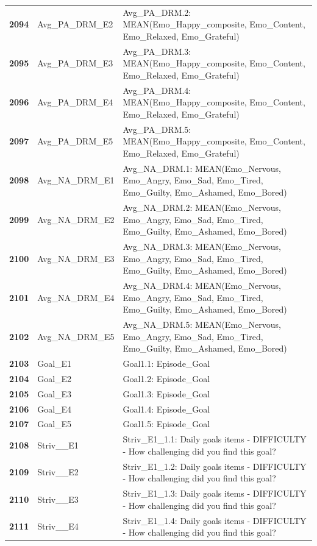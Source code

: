 \documentclass[
  letterpaper,
  DIV=11,
  numbers=noendperiod]{scrartcl}
\begin{document}
\begin{longtable}[t]{>{}cll}
\textbf{2094} & Avg\_PA\_DRM\_E2 & Avg\_PA\_DRM.2: MEAN(Emo\_Happy\_composite, Emo\_Content, Emo\_Relaxed, Emo\_Grateful)\\
\textbf{2095} & Avg\_PA\_DRM\_E3 & Avg\_PA\_DRM.3: MEAN(Emo\_Happy\_composite, Emo\_Content, Emo\_Relaxed, Emo\_Grateful)\\
\addlinespace
\textbf{2096} & Avg\_PA\_DRM\_E4 & Avg\_PA\_DRM.4: MEAN(Emo\_Happy\_composite, Emo\_Content, Emo\_Relaxed, Emo\_Grateful)\\
\textbf{2097} & Avg\_PA\_DRM\_E5 & Avg\_PA\_DRM.5: MEAN(Emo\_Happy\_composite, Emo\_Content, Emo\_Relaxed, Emo\_Grateful)\\
\textbf{2098} & Avg\_NA\_DRM\_E1 & Avg\_NA\_DRM.1: MEAN(Emo\_Nervous, Emo\_Angry, Emo\_Sad, Emo\_Tired, Emo\_Guilty, Emo\_Ashamed, Emo\_Bored)\\
\textbf{2099} & Avg\_NA\_DRM\_E2 & Avg\_NA\_DRM.2: MEAN(Emo\_Nervous, Emo\_Angry, Emo\_Sad, Emo\_Tired, Emo\_Guilty, Emo\_Ashamed, Emo\_Bored)\\
\textbf{2100} & Avg\_NA\_DRM\_E3 & Avg\_NA\_DRM.3: MEAN(Emo\_Nervous, Emo\_Angry, Emo\_Sad, Emo\_Tired, Emo\_Guilty, Emo\_Ashamed, Emo\_Bored)\\
\addlinespace
\textbf{2101} & Avg\_NA\_DRM\_E4 & Avg\_NA\_DRM.4: MEAN(Emo\_Nervous, Emo\_Angry, Emo\_Sad, Emo\_Tired, Emo\_Guilty, Emo\_Ashamed, Emo\_Bored)\\
\textbf{2102} & Avg\_NA\_DRM\_E5 & Avg\_NA\_DRM.5: MEAN(Emo\_Nervous, Emo\_Angry, Emo\_Sad, Emo\_Tired, Emo\_Guilty, Emo\_Ashamed, Emo\_Bored)\\
\textbf{2103} & Goal\_E1 & Goal1.1: Episode\_Goal\\
\textbf{2104} & Goal\_E2 & Goal1.2: Episode\_Goal\\
\textbf{2105} & Goal\_E3 & Goal1.3: Episode\_Goal\\
\addlinespace
\textbf{2106} & Goal\_E4 & Goal1.4: Episode\_Goal\\
\textbf{2107} & Goal\_E5 & Goal1.5: Episode\_Goal\\
\textbf{2108} & Striv\_\_E1 & Striv\_E1\_1.1: Daily goals items - DIFFICULTY - How challenging did you find this goal?\\
\textbf{2109} & Striv\_\_E2 & Striv\_E1\_1.2: Daily goals items - DIFFICULTY - How challenging did you find this goal?\\
\textbf{2110} & Striv\_\_E3 & Striv\_E1\_1.3: Daily goals items - DIFFICULTY - How challenging did you find this goal?\\
\addlinespace
\textbf{2111} & Striv\_\_E4 & Striv\_E1\_1.4: Daily goals items - DIFFICULTY - How challenging did you find this goal?\\

\end{longtable}
\end{document}

